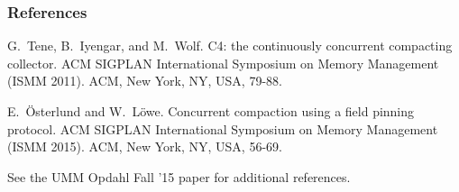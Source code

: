 \documentclass{beamer}
\newcommand{\linespace}{\vskip 0.25cm}
\begin{document}
\begin{frame} 
	\frametitle{References} 

\begin{thebibliography}{lskdjf}

G.~Tene, B.~Iyengar, and M.~Wolf.
\newblock C4: the continuously concurrent compacting collector.
 ACM SIGPLAN International Symposium on Memory Management (ISMM 2011). ACM, New York, NY, USA, 79-88.

E.~\"{O}sterlund and W.~L\"{o}we.
\newblock Concurrent compaction using a field pinning protocol. 
 ACM SIGPLAN International Symposium on Memory Management (ISMM 2015). ACM, New York, NY, USA, 56-69.

\linespace
\linespace
\linespace
\begin{center}
\color{black}See the UMM Opdahl Fall '15 paper for additional references.
\end{center}


\end{thebibliography}

\end{frame} 
\end{document}

